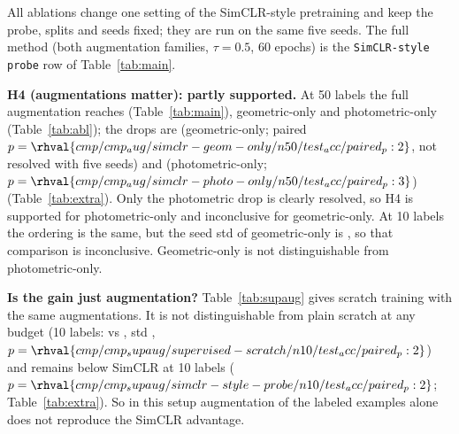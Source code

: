 All ablations change one setting of the SimCLR-style pretraining and keep the probe, splits and seeds fixed; they are run on the same five seeds. The full method (both augmentation families, $\tau=0.5$, 60 epochs) is the \texttt{SimCLR-style probe} row of Table~\ref{tab:main}.

\begin{table}[t]\centering\caption{Augmentation ablation: test accuracy of SimCLR with one augmentation family only (5 seeds).}\label{tab:abl}
\resizebox{0.85\columnwidth}{!}{}\end{table}

\begin{table}[t]\centering\caption{Supervised scratch with the full SimCLR augmentation applied to the labeled examples (5 seeds).}\label{tab:supaug}
\resizebox{0.85\columnwidth}{!}{}\end{table}

\textbf{H4 (augmentations matter): partly supported.} At 50 labels the full augmentation reaches  (Table~\ref{tab:main}), geometric-only  and photometric-only  (Table~\ref{tab:abl}); the drops are  (geometric-only; paired $p=\rhval{cmp/cmp_aug/simclr-geom-only/n50/test_acc/paired_p:2}$, not resolved with five seeds) and  (photometric-only; $p=\rhval{cmp/cmp_aug/simclr-photo-only/n50/test_acc/paired_p:3}$) (Table~\ref{tab:extra}). Only the photometric drop is clearly resolved, so H4 is supported for photometric-only and inconclusive for geometric-only. At 10 labels the ordering is the same, but the seed std of geometric-only is , so that comparison is inconclusive. Geometric-only is not distinguishable from photometric-only.

\textbf{Is the gain just augmentation?} Table~\ref{tab:supaug} gives scratch training with the same augmentations. It is not distinguishable from plain scratch at any budget (10 labels:  vs , std , $p=\rhval{cmp/cmp_supaug/supervised-scratch/n10/test_acc/paired_p:2}$) and remains below SimCLR at 10 labels ($p=\rhval{cmp/cmp_supaug/simclr-style-probe/n10/test_acc/paired_p:2}$; Table~\ref{tab:extra}). So in this setup augmentation of the labeled examples alone does not reproduce the SimCLR advantage.

